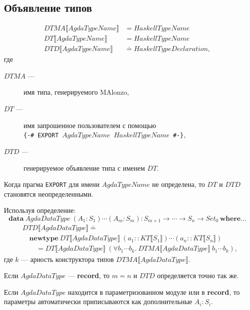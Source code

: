 \subsection{Объявление типов}

\begin{align*}
DTMA\llbracket AgdaTypeName \rrbracket &= HaskellTypeName\\
DT\llbracket AgdaTypeName \rrbracket &= HaskellTypeName\\
DTD\llbracket AgdaTypeName \rrbracket &\doteq HaskellTypeDeclaration,
\end{align*}
где
\begin{description}
\item[\(DTMA\) ---] имя типа, генерируемого MAlonzo,
\item[\(DT\) ---] имя запрошенное пользователем с помощью\\
\texttt{\{-\# EXPORT \(AgdaTypeName\) \(HaskellTypeName\) \#-\}},
\item[\(DTD\) ---] генерируемое объявление типа с именем \(DT\).
\end{description}

Когда прагма \texttt{EXPORT} для имени \(AgdaTypeName\) не определена,
то \(DT\) и \(DTD\) становятся неопределенными.

Используя определение:
\[
\mathbf{data}\ AgdaDataType\ (A_1 : S_1) \cdots (A_m : S_m) :
   S_{m+1} \rightarrow \cdots \rightarrow S_n \rightarrow Set_0\ \mathbf{where} \dots
\]
\begin{align*}
&DTD\llbracket AgdaDataType \rrbracket \doteq\\
&\quad \mathbf{newtype}\ DT\llbracket AgdaDataType \rrbracket\ (
   a_1 :: KT\llbracket S_1 \rrbracket) \cdots (a_n :: KT\llbracket S_n \rrbracket)\\
&\quad\quad = DT\llbracket AgdaDataType \rrbracket\ (\forall b_1 \cdots
   b_k.\ DTMA\llbracket AgdaDataType \rrbracket\ b_1 \cdots b_k),
\end{align*}
где \(k\) --- арность конструктора типов \(DTMA\llbracket AgdaDataType \rrbracket\).

Если \(AgdaDataType\) --- \textbf{record}, то \(m = n\) и \(DTD\) определяется
точно так же.

Если \(AgdaDataType\) находится в параметризованном модуле или в \textbf{record}, то
параметры автоматически приписываются как дополнительные \(A_i : S_i\).

